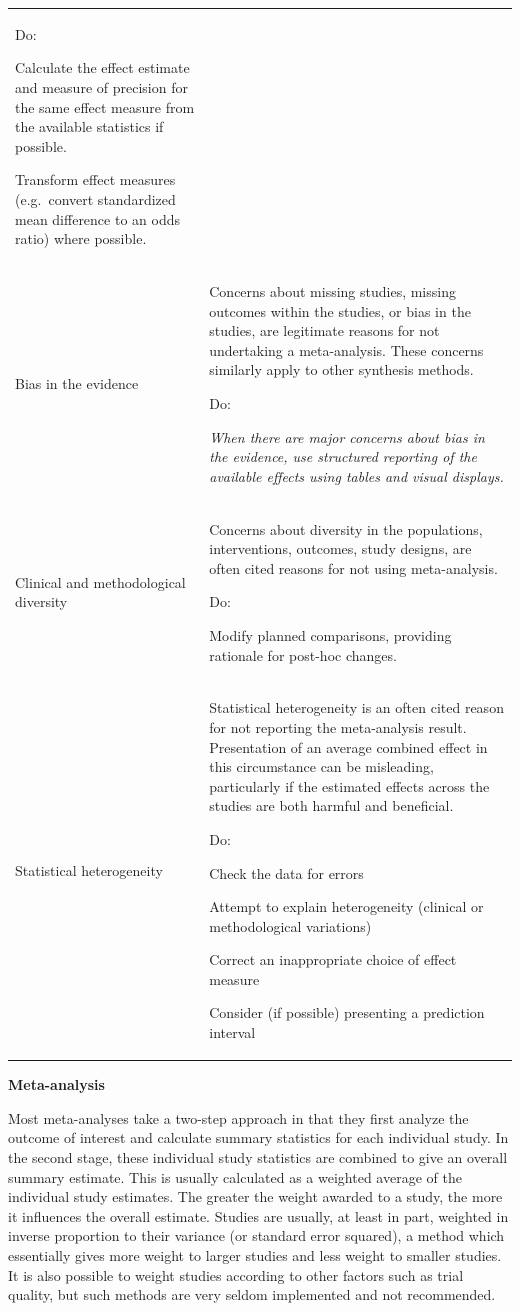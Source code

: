 \documentclass[
  11pt,
  a4paper,
  DIV=11,
  numbers=noendperiod]{scrreprt}
\begin{document}
\begin{longtable}[]{@{}
  >{\raggedright\arraybackslash}p{}
  >{\raggedright\arraybackslash}p{}@{}}
Do:

Calculate the effect estimate and measure of precision for the same
effect measure from the available statistics if possible.

Transform effect measures (e.g.~convert standardized mean difference to
an odds ratio) where possible. \\
Bias in the evidence & Concerns about missing studies, missing outcomes
within the studies, or bias in the studies, are legitimate reasons for
not undertaking a meta-analysis. These concerns similarly apply to other
synthesis methods.

Do:

\emph{When there are major concerns about bias in the evidence, use
structured reporting of the available effects using tables and visual
displays.} \\
Clinical and methodological diversity & Concerns about diversity in the
populations, interventions, outcomes, study designs, are often cited
reasons for not using meta-analysis.

Do:

Modify planned comparisons, providing rationale for post-hoc changes. \\
Statistical heterogeneity & Statistical heterogeneity is an often cited
reason for not reporting the meta-analysis result. Presentation of an
average combined effect in this circumstance can be misleading,
particularly if the estimated effects across the studies are both
harmful and beneficial.

Do:

Check the data for errors

Attempt to explain heterogeneity (clinical or methodological variations)

Correct an inappropriate choice of effect measure

Consider (if possible) presenting a prediction interval \\
\end{longtable}

\textbf{Meta-analysis}

Most meta-analyses take a two-step approach in that they first analyze
the outcome of interest and calculate summary statistics for each
individual study. In the second stage, these individual study statistics
are combined to give an overall summary estimate. This is usually
calculated as a weighted average of the individual study estimates. The
greater the weight awarded to a study, the more it influences the
overall estimate. Studies are usually, at least in part, weighted in
inverse proportion to their variance (or standard error squared), a
method which essentially gives more weight to larger studies and less
weight to smaller studies. It is also possible to weight studies
according to other factors such as trial quality, but such methods are
very seldom implemented and not recommended.
\end{document}
